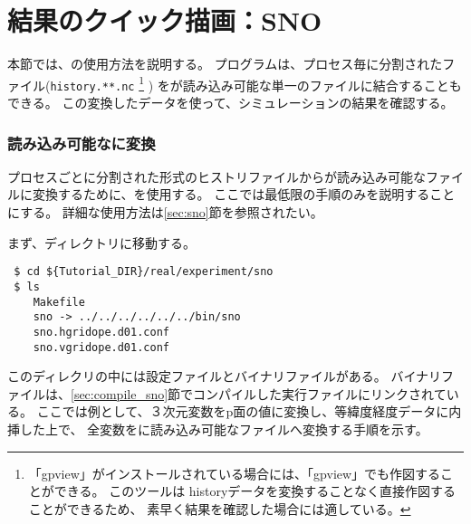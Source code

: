 \section{結果のクイック描画：SNO} \label{sec:quicklook}

本節では、\sno の使用方法を説明する。
プログラム\sno は、プロセス毎に分割された{\netcdf}ファイル(\verb|history.**.nc|
\footnote{「gpview」がインストールされている場合には、「gpview」でも作図することができる。
このツールは historyデータを変換することなく直接作図することができるため、
素早く結果を確認した場合には適している。
}
)
を{\grads}が読み込み可能な単一の{\netcdf}ファイルに結合することもできる。
この変換した{\netcdf}データを使って、シミュレーションの結果を確認する。


\subsubsection{{\grads}読み込み可能な{\netcdf}に変換}
プロセスごとに分割された{\netcdf}形式のヒストリファイルから{\grads}が読み込み可能な{\netcdf}ファイルに変換するために、\sno を使用する。
ここでは最低限の手順のみを説明することにする。
詳細な使用方法は\ref{sec:sno}節を参照されたい。

まず、\sno ディレクトリに移動する。
\begin{verbatim}
 $ cd ${Tutorial_DIR}/real/experiment/sno
 $ ls
    Makefile
    sno -> ../../../../../../bin/sno
    sno.hgridope.d01.conf
    sno.vgridope.d01.conf
\end{verbatim}
このディレクリの中には設定ファイルとバイナリファイルがある。
バイナリファイルは、\ref{sec:compile_sno}節でコンパイルした実行ファイルにリンクされている。
ここでは例として、３次元変数をp面の値に変換し、等緯度経度データに内挿した上で、
全変数を{\grads}に読み込み可能な{\netcdf}ファイルへ変換する手順を示す。


